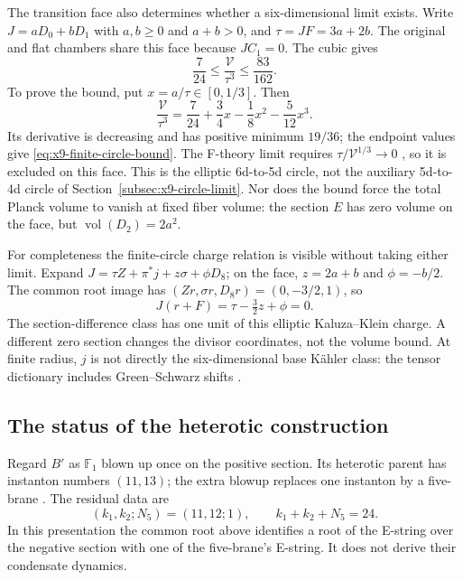 The transition face also determines whether a six-dimensional
limit exists. Write $J=aD_0+bD_1$ with $a,b\geq0$ and
$a+b>0$, and $\tau=JF=3a+2b$. The original and flat chambers
share this face because $JC_1=0$. The cubic gives
\begin{equation}
 \frac7{24}\leq\frac{\mathcal V}{\tau^3}\leq\frac{83}{162}.
 \label{eq:x9-finite-circle-bound}
\end{equation}
To prove the bound, put $x=a/\tau\in[0,1/3]$. Then
\begin{equation}
 \frac{\mathcal V}{\tau^3}
 =\frac7{24}+\frac34x-\frac18x^2-\frac5{12}x^3.
\end{equation}
Its derivative is decreasing and has positive minimum $19/36$;
the endpoint values give \eqref{eq:x9-finite-circle-bound}.
The F-theory limit requires $\tau/\mathcal V^{1/3}\to0$
\cite{Bonetti:2011mw}, so it is excluded on this face.
This is the elliptic 6d-to-5d circle, not the auxiliary 5d-to-4d
circle of Section~\ref{subsec:x9-circle-limit}. Nor does the
bound force the total Planck volume to vanish at fixed fiber
volume: the section $E$ has zero volume on the face, but
$\operatorname{vol}(D_2)=2a^2$.

For completeness the finite-circle charge relation is visible
without taking either limit. Expand
$J=\tau Z+\pi^*j+z\sigma+\phi D_8$; on the face,
$z=2a+b$ and $\phi=-b/2$. The common root image has
$(Zr,\sigma r,D_8r)=(0,-3/2,1)$, so
\begin{equation}
 J(r+F)=\tau-\tfrac32z+\phi=0.
 \label{eq:x9-affine-charge-relation}
\end{equation}
The section-difference class has one unit of this elliptic
Kaluza--Klein charge. A different zero section changes the
divisor coordinates, not the volume bound. At finite radius,
$j$ is not directly the six-dimensional base K\"ahler class:
the tensor dictionary includes Green--Schwarz shifts
\cite{Bonetti:2011mw,Grimm:2015gka}.

\subsection{The status of the heterotic construction}
\label{subsec:heterotic-k3}

Regard $B'$ as $\mathbb F_1$ blown up once on the positive
section. Its heterotic parent has instanton numbers $(11,13)$;
the extra blowup replaces one instanton by a five-brane
\cite{Morrison:1996na,Morrison:1996xf}. The residual data are
\begin{equation}
 (k_1,k_2;N_5)=(11,12;1),\qquad k_1+k_2+N_5=24.
 \label{eq:x9-heterotic-instantons}
\end{equation}
In this presentation the common root above identifies a root
of the E-string over the negative section with one of the
five-brane's E-string. It does not derive their condensate
dynamics.

